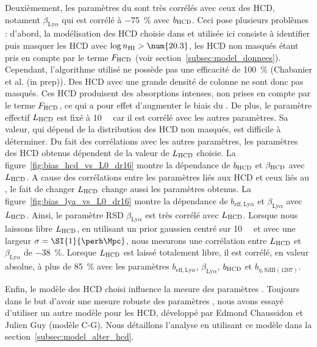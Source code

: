Deuxièmement, les paramètres du \lya{} sont très corrélés avec ceux des HCD, notament $\beta_{\mathrm{Ly}\alpha}$ qui est corrélé à \SI{-75}{\percent} avec $b_{\textsc{HCD}}$. Ceci pose plusieurs problèmes : d'abord, la modélisation des HCD choisie dans \textcite{DuMasdesBourboux2020} et utilisée ici consiste à identifier puis masquer les HCD avec $\log n_{\textsc{HI}} > \num{20.3}$, les HCD non masqués étant pris en compte par le terme $F_{\textsc{HCD}}$ (voir section~\ref{subsec:model_donnees}). Cependant, l'algorithme utilisé ne possède pas une efficacité de \SI{100}{\percent} (Chabanier et al. (in prep)). Des HCD avec une grande densité de colonne ne sont donc pas masqués.
Ces HCD produisent des absorptions intenses, non prises en compte par le terme $F_{\textsc{HCD}}$, ce qui a pour effet d'augmenter le biais du \lya{}.
De plus, le paramètre effectif $L_{\textsc{HCD}}$ est fixé à \SI{10}{\perh\Mpc} car il est corrélé avec les autres paramètres.
Sa valeur, qui dépend de la distribution des HCD non masqués, est difficile à déterminer.
Du fait des corrélations avec les autres paramètres, les paramètres des HCD obtenus dépendent de la valeur de $L_{\textsc{HCD}}$ choisie.
La figure~\ref{fig:bias_hcd_vs_L0_dr16} montre la dépendance de $b_{\textsc{HCD}}$ et $\beta_{\textsc{HCD}}$ avec $L_{\textsc{HCD}}$.
A cause des corrélations entre les paramètres liés aux HCD et ceux liés au \lya{}, le fait de changer $L_{\textsc{HCD}}$ change aussi les paramètres \lya{} obtenus.
La figure~\ref{fig:bias_lya_vs_L0_dr16} montre la dépendance de $b_{\mathrm{eff},\mathrm{Ly}\alpha}$ et $\beta_{\mathrm{Ly}\alpha}$ avec $L_{\textsc{HCD}}$. Ainsi, le paramètre RSD $\beta_{\mathrm{Ly}\alpha}$ est très corrélé avec $L_{\textsc{HCD}}$. Lorsque nous laissons libre $L_{\textsc{HCD}}$, en utilisant un prior gaussien centré sur \SI{10}{\perh\Mpc} et avec une largeur $\sigma = \SI{1}{\perh\Mpc}$, nous mesurons une corrélation entre $L_{\textsc{HCD}}$ et $\beta_{\mathrm{Ly}\alpha}$ de \SI{-38}{\percent}. Lorsque $L_{\textsc{HCD}}$ est laissé totalement libre, il est corrélé, en valeur absolue, à plus de \SI{85}{\percent} avec les paramètres $b_{\mathrm{eff},\mathrm{Ly}\alpha}$, $\beta_{\mathrm{Ly}\alpha}$, $b_{\textsc{HCD}}$ et $b_{\eta, \mathrm{SiIII}(1207)}$.

Enfin, le modèle des HCD choisi influence la mesure des paramètres \lya{}. Toujours dans le but d'avoir une mesure robuste des paramètres \lya{}, nous avons essayé d'utiliser un autre modèle pour les HCD, développé par Edmond Chaussidon et Julien Guy (modèle C-G). Nous détaillons l'analyse en utilisant ce modèle dans la section~\ref{subsec:model_alter_hcd}.

